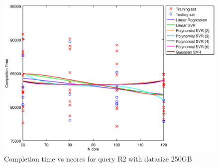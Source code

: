 
\begin {figure}[hbtp]
\centering
\includegraphics[width=\textwidth]{output/R2_250_ONLY_1_LINEAR_NCORE/plot_R2_250.eps}
\caption{Completion time vs ncores for query R2 with datasize 250GB}
\label{fig:only_1_linear_R2_250}
\end {figure}
